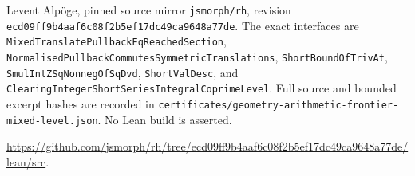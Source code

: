 Levent Alp\"oge, pinned source mirror \texttt{jsmorph/rh}, revision
\texttt{ecd09ff9b4aaf6c08f2b5ef17dc49ca9648a77de}.
The exact interfaces are \texttt{MixedTranslatePullbackEqReachedSection},
\texttt{NormalisedPullbackCommutesSymmetricTranslations},
\texttt{ShortBoundOfTrivAt}, \texttt{SmulIntZSqNonnegOfSqDvd},
\texttt{ShortValDesc}, and
\texttt{ClearingIntegerShortSeriesIntegralCoprimeLevel}.
Full source and bounded excerpt hashes are recorded in
\texttt{certificates/geometry-arithmetic-frontier-mixed-level.json}.
No Lean build is asserted.\par
\url{https://github.com/jsmorph/rh/tree/ecd09ff9b4aaf6c08f2b5ef17dc49ca9648a77de/lean/src}.
